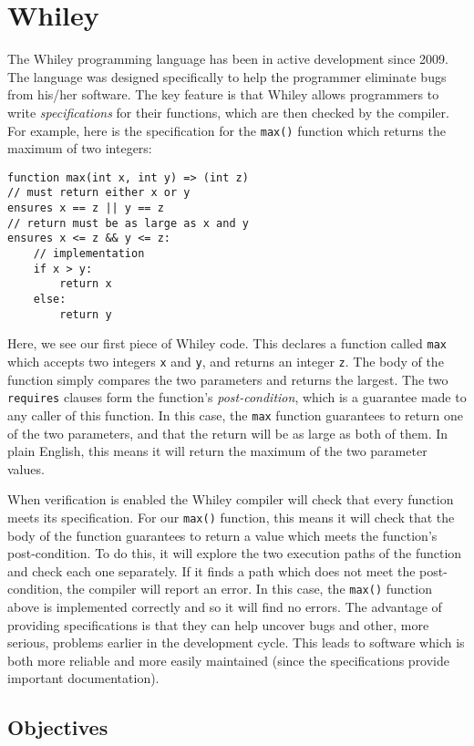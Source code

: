 \section{Whiley}
The Whiley programming language has been in active development since 2009.  The language was designed specifically to help the programmer eliminate bugs from his/her software.  The key feature is that Whiley allows programmers to write {\em specifications} for their functions, which are then checked by the compiler.  For example, here is the specification for the \lstinline{max()} function which returns the maximum of two integers:

\begin{lstlisting}
function max(int x, int y) => (int z)
// must return either x or y
ensures x == z || y == z
// return must be as large as x and y
ensures x <= z && y <= z:
    // implementation
    if x > y:
        return x
    else:
        return y
\end{lstlisting}

Here, we see our first piece of Whiley code.  This declares a function called \lstinline{max} which accepts two integers \lstinline{x} and \lstinline{y}, and returns an integer \lstinline{z}.  The body of the function simply compares the two parameters and returns the largest.
The two \lstinline{requires} clauses form the function's {\em post-condition}, which is a guarantee made to any caller of this function.  In this case, the \lstinline{max} function guarantees to return one of the two parameters, and that the return will be as large as both of them.  In plain English, this means it will return the maximum of the two parameter values.

When verification is enabled the Whiley compiler will check that every function meets its specification.  For our \lstinline{max()} function,
this means it will check that the body of the function guarantees to return a value which meets the function's post-condition.  To do this, it will explore the two execution paths of the function and check each one separately.  If it finds a path which does not meet the post-condition, the compiler will report an error.  In this case, the \lstinline{max()} function above is implemented correctly and so it will find no errors.  The advantage of providing specifications is that they can help uncover bugs and other, more serious, problems earlier in the development cycle.  This leads to software which is both more reliable and more easily maintained (since the specifications provide important documentation).

\subsection{Objectives}
